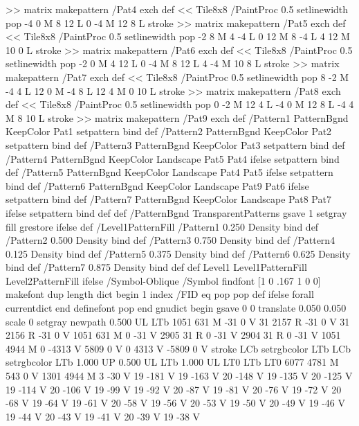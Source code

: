 {{{>> matrix makepattern
/Pat4 exch def
<< Tile8x8
 /PaintProc {0.5 setlinewidth pop -4 0 M 8 12 L
	0 -4 M 12 8 L stroke}
>> matrix makepattern
/Pat5 exch def
<< Tile8x8
 /PaintProc {0.5 setlinewidth pop -2 8 M 4 -4 L
	0 12 M 8 -4 L 4 12 M 10 0 L stroke}
>> matrix makepattern
/Pat6 exch def
<< Tile8x8
 /PaintProc {0.5 setlinewidth pop -2 0 M 4 12 L
	0 -4 M 8 12 L 4 -4 M 10 8 L stroke}
>> matrix makepattern
/Pat7 exch def
<< Tile8x8
 /PaintProc {0.5 setlinewidth pop 8 -2 M -4 4 L
	12 0 M -4 8 L 12 4 M 0 10 L stroke}
>> matrix makepattern
/Pat8 exch def
<< Tile8x8
 /PaintProc {0.5 setlinewidth pop 0 -2 M 12 4 L
	-4 0 M 12 8 L -4 4 M 8 10 L stroke}
>> matrix makepattern
/Pat9 exch def
/Pattern1 {PatternBgnd KeepColor Pat1 setpattern} bind def
/Pattern2 {PatternBgnd KeepColor Pat2 setpattern} bind def
/Pattern3 {PatternBgnd KeepColor Pat3 setpattern} bind def
/Pattern4 {PatternBgnd KeepColor Landscape {Pat5} {Pat4} ifelse setpattern} bind def
/Pattern5 {PatternBgnd KeepColor Landscape {Pat4} {Pat5} ifelse setpattern} bind def
/Pattern6 {PatternBgnd KeepColor Landscape {Pat9} {Pat6} ifelse setpattern} bind def
/Pattern7 {PatternBgnd KeepColor Landscape {Pat8} {Pat7} ifelse setpattern} bind def
} def
%
%
%
/PatternBgnd {
  TransparentPatterns {} {gsave 1 setgray fill grestore} ifelse
} def
%
%
/Level1PatternFill {
/Pattern1 {0.250 Density} bind def
/Pattern2 {0.500 Density} bind def
/Pattern3 {0.750 Density} bind def
/Pattern4 {0.125 Density} bind def
/Pattern5 {0.375 Density} bind def
/Pattern6 {0.625 Density} bind def
/Pattern7 {0.875 Density} bind def
} def
%
%
Level1 {Level1PatternFill} {Level2PatternFill} ifelse
%
/Symbol-Oblique /Symbol findfont [1 0 .167 1 0 0] makefont
dup length dict begin {1 index /FID eq {pop pop} {def} ifelse} forall
currentdict end definefont pop
end
gnudict begin
gsave
0 0 translate
0.050 0.050 scale
0 setgray
newpath
0.500 UL
LTb
1051 631 M
-31 0 V
31 2157 R
-31 0 V
31 2156 R
-31 0 V
1051 631 M
0 -31 V
2905 31 R
0 -31 V
2904 31 R
0 -31 V
1051 4944 M
0 -4313 V
5809 0 V
0 4313 V
-5809 0 V
stroke
LCb setrgbcolor
LTb
LCb setrgbcolor
LTb
1.000 UP
0.500 UL
LTb
1.000 UL
LT0
LTb
LT0
6077 4781 M
543 0 V
1301 4944 M
3 -30 V
19 -181 V
19 -163 V
20 -148 V
19 -135 V
20 -125 V
19 -114 V
20 -106 V
19 -99 V
19 -92 V
20 -87 V
19 -81 V
20 -76 V
19 -72 V
20 -68 V
19 -64 V
19 -61 V
20 -58 V
19 -56 V
20 -53 V
19 -50 V
20 -49 V
19 -46 V
19 -44 V
20 -43 V
19 -41 V
20 -39 V
19 -38 V
}}
